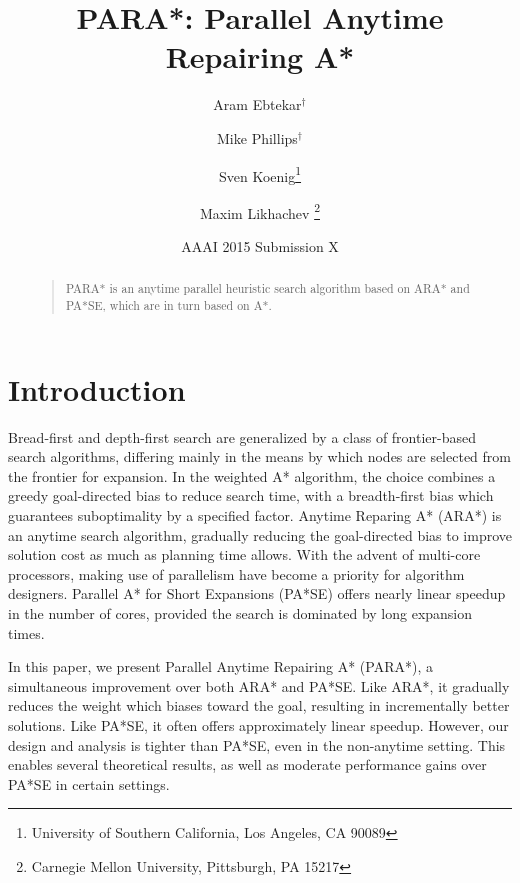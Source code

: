 \documentclass[letterpaper]{article}
\begin{document}
%
\title{PARA*: Parallel Anytime Repairing A*}
\author{Aram Ebtekar$^\dagger$ \and Mike Phillips$^\dagger$ \and Sven Koenig\thanks{University of Southern California, Los Angeles, CA 90089} \and Maxim Likhachev%
\thanks{Carnegie Mellon University, Pittsburgh, PA 15217}%
%
}
\author{AAAI 2015 Submission X}%
\maketitle
\begin{abstract}
\begin{quote}
PARA* is an anytime parallel heuristic search algorithm based on ARA* and PA*SE, which are in turn based on A*.
\end{quote}
\end{abstract}

\section{Introduction}

Bread-first and depth-first search are generalized by a class of frontier-based search algorithms, differing mainly in the means by which nodes are selected from the frontier for expansion. In the weighted A* algorithm, the choice combines a greedy goal-directed bias to reduce search time, with a breadth-first bias which guarantees suboptimality by a specified factor. Anytime Reparing A* (ARA*) is an anytime search algorithm, gradually reducing the goal-directed bias to improve solution cost as much as planning time allows. With the advent of multi-core processors, making use of parallelism have become a priority for algorithm designers. Parallel A* for Short Expansions (PA*SE) offers nearly linear speedup in the number of cores, provided the search is dominated by long expansion times.

In this paper, we present Parallel Anytime Repairing A* (PARA*), a simultaneous improvement over both ARA* and PA*SE. Like ARA*, it gradually reduces the weight which biases toward the goal, resulting in incrementally better solutions. Like PA*SE, it often offers approximately linear speedup. However, our design and analysis is tighter than PA*SE, even in the non-anytime setting. This enables several theoretical results, as well as moderate performance gains over PA*SE in certain settings.
\end{document}
